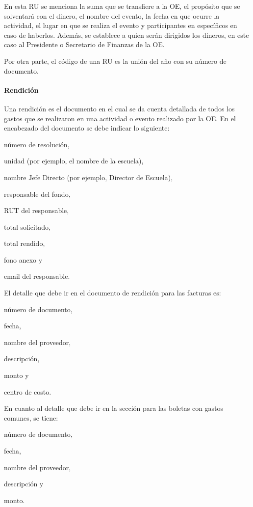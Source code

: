   En esta RU se menciona la suma que se transfiere a la OE, el propósito que se solventará con el dinero, el nombre del evento, la fecha en que ocurre la actividad, el lugar en que se realiza el evento y participantes en específicos en caso de haberlos. Además, se establece a quien serán dirigidos los dineros, en este caso al Presidente o Secretario de Finanzas de la OE.

  Por otra parte, el código de una RU es la unión del año con su número de documento. 

  \paragraph{Rendición}

  Una rendición es el documento en el cual se da cuenta detallada de todos los gastos que se realizaron en una actividad o evento realizado por la OE. En el encabezado del documento se debe indicar lo siguiente:
  \begin{enumerate*}[label=(\roman*)]
    \item número de resolución,
    \item unidad (por ejemplo, el nombre de la escuela),
    \item nombre Jefe Directo (por ejemplo, Director de Escuela),
    \item responsable del fondo,
    \item RUT del responsable,
    \item total solicitado,
    \item total rendido,
    \item fono anexo y
    \item email del responsable.
  \end{enumerate*}
  
  El detalle que debe ir en el documento de rendición para las facturas es:
  \begin{enumerate*}[label=(\roman*)]
    \item número de documento,
    \item fecha,
    \item nombre del proveedor,
    \item descripción,
    \item monto y
    \item centro de costo.
  \end{enumerate*}
  
  En cuanto al detalle que debe ir en la sección para las boletas con gastos comunes, se tiene:
  \begin{enumerate*}[label=(\roman*)]
    \item número de documento,
    \item fecha,
    \item nombre del proveedor,
    \item descripción y
    \item monto.
  \end{enumerate*}
  
